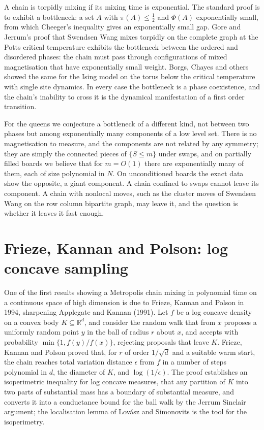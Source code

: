 A chain is torpidly mixing if its mixing time is exponential. The standard proof is to exhibit a bottleneck: a set $A$ with $\pi(A) \le \tfrac12$ and $\Phi(A)$ exponentially small, from which Cheeger's inequality gives an exponentially small gap. Gore and Jerrum's proof that Swendsen Wang mixes torpidly on the complete graph at the Potts critical temperature exhibits the bottleneck between the ordered and disordered phases: the chain must pass through configurations of mixed magnetisation that have exponentially small weight. Borgs, Chayes and others showed the same for the Ising model on the torus below the critical temperature with single site dynamics. In every case the bottleneck is a phase coexistence, and the chain's inability to cross it is the dynamical manifestation of a first order transition.

For the queens we conjecture a bottleneck of a different kind, not between two phases but among exponentially many components of a low level set. There is no magnetisation to measure, and the components are not related by any symmetry; they are simply the connected pieces of $\{ S \le m \}$ under swaps, and on partially filled boards we believe that for $m = O(1)$ there are exponentially many of them, each of size polynomial in $N$. On unconditioned boards the exact data show the opposite, a giant component. A chain confined to swaps cannot leave its component. A chain with nonlocal moves, such as the cluster moves of Swendsen Wang on the row column bipartite graph, may leave it, and the question is whether it leaves it fast enough.

\section{Frieze, Kannan and Polson: log concave sampling}

One of the first results showing a Metropolis chain mixing in polynomial time on a continuous space of high dimension is due to Frieze, Kannan and Polson in 1994, sharpening Applegate and Kannan (1991). Let $f$ be a log concave density on a convex body $K \subseteq \mathbb{R}^d$, and consider the random walk that from $x$ proposes a uniformly random point $y$ in the ball of radius $r$ about $x$, and accepts with probability $\min\{1, f(y) / f(x)\}$, rejecting proposals that leave $K$. Frieze, Kannan and Polson proved that, for $r$ of order $1/\sqrt d$ and a suitable warm start, the chain reaches total variation distance $\epsilon$ from $f$ in a number of steps polynomial in $d$, the diameter of $K$, and $\log(1/\epsilon)$. The proof establishes an isoperimetric inequality for log concave measures, that any partition of $K$ into two parts of substantial mass has a boundary of substantial measure, and converts it into a conductance bound for the ball walk by the Jerrum Sinclair argument; the localisation lemma of Lov\'asz and Simonovits is the tool for the isoperimetry.

